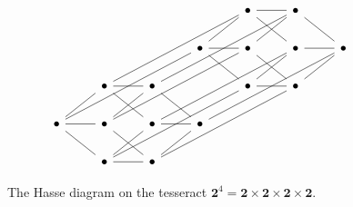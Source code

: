 \begin{figure}[h]
  \centering
  \[\begin{tikzcd}
    &&&& \bullet & \bullet \\
    &&& \bullet & \bullet & \bullet & \bullet \\
    & \bullet & \bullet && \bullet & \bullet \\
    \bullet & \bullet & \bullet & \bullet \\
    & \bullet & \bullet
    \arrow[no head, from=1-5, to=1-6]
    \arrow[no head, from=1-5, to=2-6]
    \arrow[no head, from=1-5, to=3-2]
    \arrow[no head, from=1-6, to=2-7]
    \arrow[no head, from=1-6, to=3-3]
    \arrow[no head, from=2-4, to=1-5]
    \arrow[no head, from=2-4, to=2-5]
    \arrow[no head, from=2-4, to=4-1]
    \arrow[no head, from=2-5, to=1-6]
    \arrow[no head, from=2-5, to=4-2]
    \arrow[no head, from=2-6, to=2-7]
    \arrow[no head, from=2-6, to=3-5]
    \arrow[no head, from=2-6, to=4-3]
    \arrow[no head, from=2-7, to=3-6]
    \arrow[no head, from=2-7, to=4-4]
    \arrow[no head, from=3-2, to=4-3]
    \arrow[no head, from=3-3, to=3-2]
    \arrow[no head, from=3-3, to=4-4]
    \arrow[no head, from=3-5, to=2-4]
    \arrow[no head, from=3-5, to=3-6]
    \arrow[no head, from=3-5, to=5-2]
    \arrow[no head, from=3-6, to=2-5]
    \arrow[no head, from=3-6, to=5-3]
    \arrow[no head, from=4-1, to=3-2]
    \arrow[no head, from=4-2, to=3-3]
    \arrow[no head, from=4-2, to=4-1]
    \arrow[no head, from=4-3, to=5-2]
    \arrow[no head, from=4-4, to=4-3]
    \arrow[no head, from=4-4, to=5-3]
    \arrow[no head, from=5-2, to=4-1]
    \arrow[no head, from=5-3, to=4-2]
    \arrow[no head, from=5-3, to=5-2]
  \end{tikzcd}\]
  \caption{The Hasse diagram on the tesseract $\mathbf{2}^4 =
  \mathbf{2} \times \mathbf{2} \times \mathbf{2} \times \mathbf{2}$.}
  \label{figure_1.5}
\end{figure}

